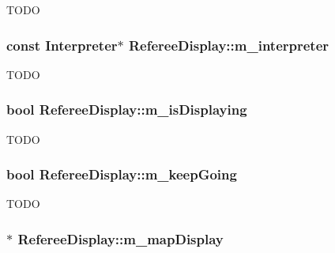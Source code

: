 \label{classRefereeDisplay_aded3908927ad3726777ece4d52cf3ca2}
TODO \hypertarget{classRefereeDisplay_a510383c894f917032aadc71f1f31074f}{
\subsubsection[{m\_\-interpreter}]{\setlength{\rightskip}{0pt plus 5cm}const {\bf Interpreter}$\ast$ {\bf RefereeDisplay::m\_\-interpreter}}}
\label{classRefereeDisplay_a510383c894f917032aadc71f1f31074f}
TODO \hypertarget{classRefereeDisplay_a12bdb098bcf59351f55bc7beb922ac62}{
\subsubsection[{m\_\-isDisplaying}]{\setlength{\rightskip}{0pt plus 5cm}bool {\bf RefereeDisplay::m\_\-isDisplaying}}}
\label{classRefereeDisplay_a12bdb098bcf59351f55bc7beb922ac62}
TODO \hypertarget{classRefereeDisplay_af3bb14682e53eef2d7d9e664f84e6ba1}{
\subsubsection[{m\_\-keepGoing}]{\setlength{\rightskip}{0pt plus 5cm}bool {\bf RefereeDisplay::m\_\-keepGoing}}}
\label{classRefereeDisplay_af3bb14682e53eef2d7d9e664f84e6ba1}
TODO \hypertarget{classRefereeDisplay_a07fda892af04771c6484160fb0e5585f}{
\subsubsection[{m\_\-mapDisplay}]{$\ast$ {\bf RefereeDisplay::m\_\-mapDisplay}}}
